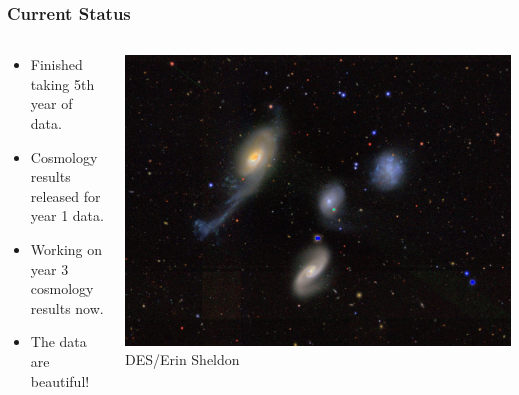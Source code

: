 \documentclass[aspectratio=169]{beamer}
\begin{document}
\frame
{

    \frametitle{Current Status}


    \begin{columns}
        \begin{column}{0.5\textwidth}
            \begin{itemize}

                \item Finished taking 5th year of data.

                \item Cosmology results released for year 1 data.

                \item Working on year 3 cosmology results now.

                \item The data are beautiful!

            \end{itemize}

        \end{column}
        \begin{column}{0.5\textwidth}
            \centering
                \includegraphics[width=\linewidth]{DES0022-4831-four.jpg}
                \newline
                {\tiny DES/Erin Sheldon}
        \end{column}

    \end{columns}


}
\end{document}
